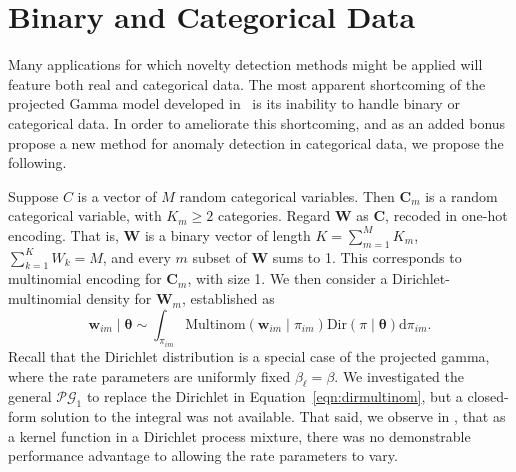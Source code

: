 \section{Binary and Categorical Data}
Many applications for which novelty detection methods might be applied will 
    feature both real and categorical data.   The most apparent 
    shortcoming of the projected Gamma model developed in~\cite{trubey:pg} is
    its inability to handle binary or categorical data.  In order to ameliorate this
    shortcoming, and as an added bonus propose a new method for anomaly detection in
    categorical data, we propose the following.

Suppose $C$ is a vector of $M$ random categorical variables.  Then $\bm{C}_{m}$ 
    is a random categorical variable, with $K_{m} \geq 2$ categories. Regard $\bm{W}$ 
    as $\bm{C}$, recoded in one-hot encoding.  That is, $\bm{W}$ is a binary vector of 
    length $K = \sum_{m = 1}^M K_{m}$, $\sum_{k = 1}^K W_k = M$, and every $m$ subset 
    of $\bm{W}$ sums to 1.  This corresponds to multinomial encoding for $\bm{C}_m$,
    with size 1. We then consider a Dirichlet-multinomial density for $\bm{W}_m$,
    established as
  \begin{equation}
    \label{eqn:dirmultinom}
    \bm{w}_{im}\mid\bm{\theta} 
    \sim 
    \int_{\pi_{im}} 
    \text{Multinom}(\bm{w}_{im}\mid\pi_{im})
    \text{Dir}(\pi\mid\bm{\theta})\text{d}\pi_{im}.
  \end{equation}
  Recall that the Dirichlet distribution is a special case of the projected gamma,
  where the rate parameters are uniformly fixed $\beta_{\ell} = \beta$.  We investigated
  the general $\mathcal{PG}_1$ to replace the Dirichlet in Equation~\ref{eqn:dirmultinom}, 
  but a closed-form solution to the integral was not available.  That said, we observe in 
  \cite{trubey:pg}, that as a kernel function in a Dirichlet process mixture, there was
  no demonstrable performance advantage to allowing the rate parameters to vary.
 
